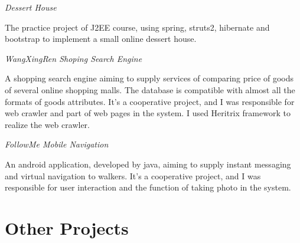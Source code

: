 \documentclass[10pt]{article} %
\begin{document}
{\begin{minipage}[t]{0.52\textwidth}
{\par}

{\raggedright\large \textit{Dessert House}\\[5pt]}

\normalsize{The practice project of J2EE course, using spring, struts2, hibernate and bootstrap to implement a small online dessert house.}\\

{\par}

{\raggedright\large \textit{WangXingRen Shoping Search Engine}\\[5pt]}

\normalsize{A shopping search engine aiming to supply services of comparing price of goods of several online shopping malls. The database is compatible with almost all the formats of goods attributes. It's a cooperative project, and I was responsible for web crawler and part of web pages in the system. I used Heritrix framework to realize the web crawler. }\\


{\par}

{\raggedright\large \textit{FollowMe Mobile Navigation}\\[5pt]}
\normalsize{An android application, developed by java, aiming to supply instant messaging and virtual navigation to walkers. It's a cooperative project, and I was responsible for user interaction and the function of taking photo in the system.}\\





\section{Other Projects} 


\end{minipage}}
\end{document}
